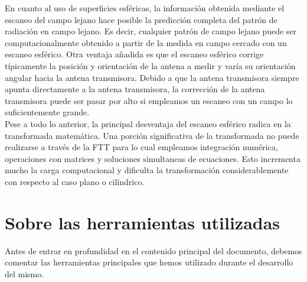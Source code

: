 En cuanto al uso de superficies esféricas, la información obtenida mediante el escaneo del campo lejano hace posible la predicción completa del patrón de radiación en campo lejano. Es decir, cualquier patrón de campo lejano puede ser computacionalmente obtenido a partir de la medida en campo cercado con un escaneo esférico. Otra ventaja añadida es que el escaneo esférico corrige típicamente la posición y orientación de la antena a medir y varía su orientación angular hacia la antena transmisora. Debido a que la antena transmisora siempre apunta directamente a la antena transmisora, la corrección de la antena transmisora puede ser pasar por alto si empleamos un escaneo con un campo lo suficientemente grande.\\

Pese a todo lo anterior, la principal desventaja del escaneo esférico radica en la transformada matemática. Una porción significativa de la transformada no puede realizarse a través de la FTT para lo cual empleamos integración numérica, operaciones con matrices y soluciones simultaneas de ecuaciones. Esto incrementa mucho la carga computacional y dificulta la transformación considerablemente con respecto al caso plano o cilíndrico.\\

\newpage

\section{Sobre las herramientas utilizadas}

Antes de entrar en profundidad en el contenido principal del documento, debemos comentar las herramientas principales que hemos utilizado durante el desarrollo del mismo.

